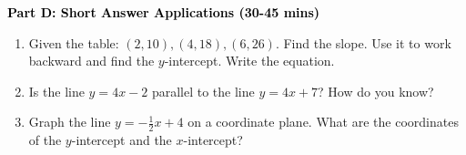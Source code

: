 \documentclass[12pt, letterpaper, fleqn]{article}
\begin{document}
\newpage

\begin{tcolorbox}[colback=customteal!20]
\large\textcolor{black}{\textbf{Part D: Short Answer Applications (30-45 mins)}}
\end{tcolorbox}

\vspace{3mm}

\begin{enumerate}[itemsep=4.2cm, leftmargin=0.6cm, resume]
\item Given the table: $(2, 10), (4, 18), (6, 26)$. Find the slope. Use it to work backward and find the $y$-intercept. Write the equation.
\item Is the line $y = 4x - 2$ parallel to the line $y = 4x + 7$? How do you know?
\item Graph the line $y = -\frac{1}{2}x + 4$ on a coordinate plane. What are the coordinates of the $y$-intercept and the $x$-intercept?
\end{enumerate}
\end{document}
